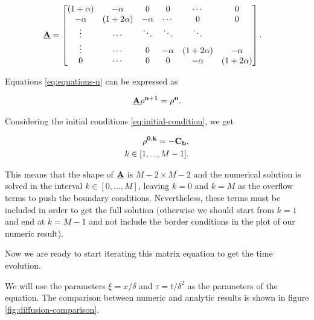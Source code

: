 \begin{align}
\bf{\underline{A}} &= \begin{bmatrix}
           ( 1 + \alpha ) & -\alpha  &  0 & 0 &  \cdots & 0\\
             -\alpha & ( 1 + 2 \alpha ) & -\alpha & \cdots & 0 & 0\\
           \vdots  &\cdots  & \ddots & \ddots &  \ddots&  \\
            \vdots & \cdots & 0  &  -\alpha & ( 1 + 2 \alpha ) & -\alpha \\
            0 & \cdots &0  & 0 & -\alpha & ( 1 + 2 \alpha )
         \end{bmatrix}
         \label{eq:discretization-matrix}.
\end{align}

Equations \ref{eq:equations-n} can be expressed as

\begin{align}
    \bf{\underline{A}} \bf{\rho^{n+1}}  = \bf{\rho^n} .
\end{align}

Considering the initial conditions \ref{eq:initial-condition}, we get

\begin{align}
    \bf{\rho^{0,k}} = -C_b, \\
    k \in [1,..., M-1].
\end{align}

This means that the shape of $\bf{\underline{A}}$ is $M-2 \times M-2$ and the numerical solution is solved in the interval  $k \in [0,..., M]$, leaving $k=0$ and $k=M$ as the overflow terms to push the boundary conditions. Nevertheless, these terms must be included in order to get the full solution (otherwise we should start from $k=1$ and end at $k=M-1$ and not include the border conditions in the plot of our numeric result).

Now we are ready to start iterating this matrix equation to get the time evolution.

We will use the parameters $\xi = x/\delta$ and $\tau = t/\delta^2$ as the parameters of the equation. The comparison between numeric and analytic results is shown in figure \ref{fig:diffusion-comparison}.